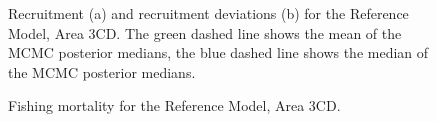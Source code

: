 \documentclass[11pt]{book}
\begin{document}
\begin{figure}[htb]

{\centering {} 

}

\caption{Recruitment (a) and recruitment deviations (b) for the Reference Model, Area 3CD.  The green dashed line shows the mean of the MCMC posterior medians, the blue dashed line shows the median of the MCMC posterior medians.}\label{fig:fig-base-recr-3cd}
\end{figure}
\begin{figure}[htb]

{\centering {} 

}

\caption{Fishing mortality for the Reference Model, Area 3CD.}\label{fig:fig-base-f-3cd}
\end{figure}
\clearpage
\end{document}
